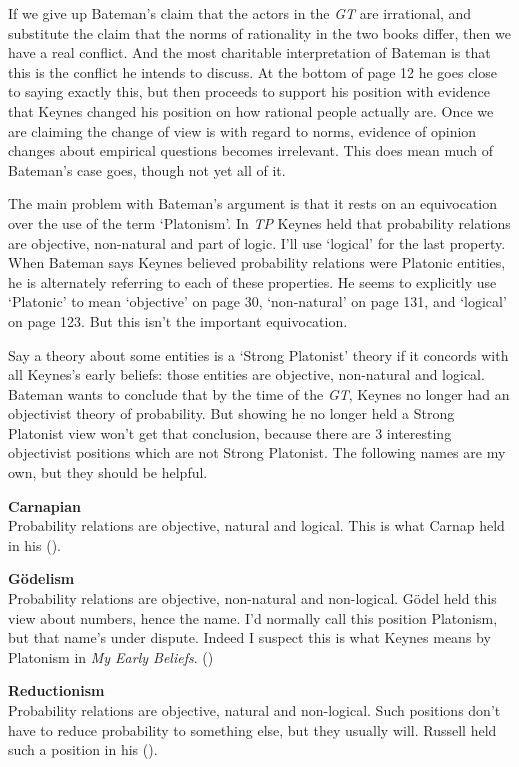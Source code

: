 \documentclass[
  10pt,
  letterpaper,
  DIV=11,
  numbers=noendperiod,
  twoside]{scrartcl}
\begin{document}
If we give up Bateman's claim that the actors in the \emph{GT} are
irrational, and substitute the claim that the norms of rationality in
the two books differ, then we have a real conflict. And the most
charitable interpretation of Bateman is that this is the conflict he
intends to discuss. At the bottom of page 12 he goes close to saying
exactly this, but then proceeds to support his position with evidence
that Keynes changed his position on how rational people actually are.
Once we are claiming the change of view is with regard to norms,
evidence of opinion changes about empirical questions becomes
irrelevant. This does mean much of Bateman's case goes, though not yet
all of it.

The main problem with Bateman's argument is that it rests on an
equivocation over the use of the term `Platonism'. In \emph{TP} Keynes
held that probability relations are objective, non-natural and part of
logic. I'll use `logical' for the last property. When Bateman says
Keynes believed probability relations were Platonic entities, he is
alternately referring to each of these properties. He seems to
explicitly use `Platonic' to mean `objective' on page 30, `non-natural'
on page 131, and `logical' on page 123. But this isn't the important
equivocation.

Say a theory about some entities is a `Strong Platonist' theory if it
concords with all Keynes's early beliefs: those entities are objective,
non-natural and logical. Bateman wants to conclude that by the time of
the \emph{GT}, Keynes no longer had an objectivist theory of
probability. But showing he no longer held a Strong Platonist view won't
get that conclusion, because there are 3 interesting objectivist
positions which are not Strong Platonist. The following names are my
own, but they should be helpful.

\textbf{Carnapian}\\
Probability relations are objective, natural and logical. This is what
Carnap held in his ().

\textbf{Gödelism}\\
Probability relations are objective, non-natural and non-logical. Gödel
held this view about numbers, hence the name. I'd normally call this
position Platonism, but that name's under dispute. Indeed I suspect this
is what Keynes means by Platonism in \emph{My Early Beliefs}.
()

\textbf{Reductionism}\\
Probability relations are objective, natural and non-logical. Such
positions don't have to reduce probability to something else, but they
usually will. Russell held such a position in his
().
\end{document}
